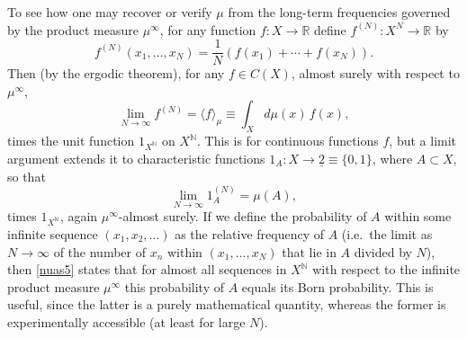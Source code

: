 \documentclass[12pt]{article}
\numberwithin{equation}{section}
\newcommand{\er}{\eqref}
\newcommand{\ul}{\underline}
\newcommand{\raw}{\rightarrow}
\newcommand{\la}{\langle} \newcommand{\ra}{\rangle}
\newcommand{\N}{{\mathbb N}} \newcommand{\R}{{\mathbb R}}
\begin{document}
To see how one may recover or verify $\mu$ from the long-term frequencies governed by the product measure $\mu^{\infty}$, for any function $f:X\raw\R$ define  $f^{(N)}:X^N\raw\R$ by 
\begin{equation}
f^{(N)}(x_1, \ldots, x_N)=\frac{1}{N}(f(x_1)+\cdots + f(x_N)). \label{fN}
\end{equation}
Then (by the ergodic theorem), for any $f\in C(X)$, almost surely with respect to $\mu^{\infty}$,
\begin{equation}
\lim_{N\raw\infty}f^{(N)}=\la f\ra_{\mu} \equiv \int_{X}d\mu(x)\, f(x)
,\label{nuas3}
\end{equation}
times  the unit function $1_{X^{\N}}$ on  $X^{\N}$. This is  for continuous functions $f$, but
a limit argument extends it to characteristic functions $1_A:X\raw\ul{2}\equiv \{0,1\}$, where $A\subset X$, so that  
\begin{equation}
\lim_{N\raw\infty} 1_A^{(N)}= \mu(A),  \label{nuas5}
\end{equation}
times $1_{X^{\N}}$, again $\mu^{\infty}$-almost surely. If we define the probability of $A$ within some infinite sequence $(x_1, x_2, \ldots)$ as the relative frequency of $A$ (i.e.\ the limit as $N\raw\infty$ of the number of $x_n$ within $(x_1, \ldots, x_N)$ that lie in $A$ divided by $N$),
then \er{nuas5} states that for almost all sequences  in $X^{\N}$ 
 with respect to the infinite product measure $\mu^{\infty}$
 this probability of $A$ equals its Born probability. This is  useful, since the latter is a purely mathematical quantity, whereas the former is experimentally accessible (at least for large $N$).
 
\end{document}
